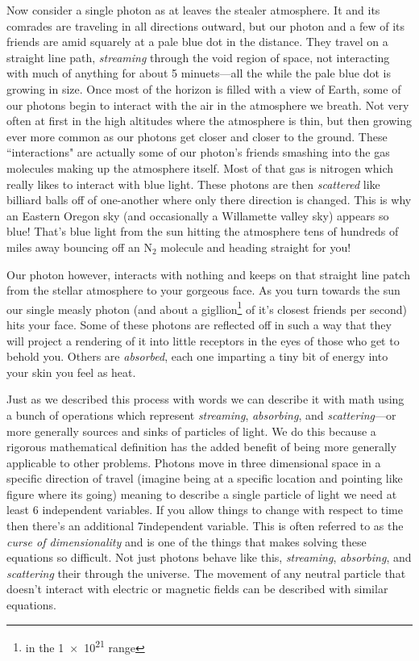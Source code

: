 Now consider a single photon as at leaves the stealer atmosphere.
It and its comrades are traveling in all directions outward, but our photon and a few of its friends are amid squarely at a pale blue dot in the distance.
They travel on a straight line path, \textit{streaming} through the void region of space, not interacting with much of anything for about 5 minuets---all the while the pale blue dot is growing in size.
Once most of the horizon is filled with a view of Earth, some of our photons begin to interact with the air in the atmosphere we breath.
Not very often at first in the high altitudes where the atmosphere is thin, but then growing ever more common as our photons get closer and closer to the ground.
These ``interactions" are actually some of our photon's friends smashing into the gas molecules making up the atmosphere itself.
Most of that gas is nitrogen which really likes to interact with blue light.
These photons are then \textit{scattered} like billiard balls off of one-another where only there direction is changed.
This is why an Eastern Oregon sky (and occasionally a Willamette valley sky) appears so blue!
That's blue light from the sun hitting the atmosphere tens of hundreds of miles away bouncing off an N$_2$ molecule and heading straight for you!

Our photon however, interacts with nothing and keeps on that straight line patch from the stellar atmosphere to your gorgeous face.
As you turn towards the sun our single measly photon (and about a gigllion\footnote{in the \num{1e21} range} of it's closest friends per second) hits your face.
Some of these photons are reflected off in such a way that they will project a rendering of it into little receptors in the eyes of those who get to behold you.
Others are \textit{absorbed}, each one imparting a tiny bit of energy into your skin you feel as heat.

Just as we described this process with words we can describe it with math using a bunch of operations which represent \textit{streaming}, \textit{absorbing}, and \textit{scattering}---or more generally sources and sinks of particles of light.
We do this because a rigorous mathematical definition has the added benefit of being more generally applicable to other problems.
Photons move in three dimensional space in a specific direction of travel (imagine being at a specific location and pointing like figure where its going) meaning to describe a single particle of light we need at least 6 independent variables.
If you allow things to change with respect to time then there's an additional 7\ths independent variable.
This is often referred to as the \textit{curse of dimensionality} and is one of the things that makes solving these equations so difficult.
Not just photons behave like this, \textit{streaming}, \textit{absorbing}, and \textit{scattering} their through the universe.
The movement of any neutral particle that doesn't interact with electric or magnetic fields can be described with similar equations.


